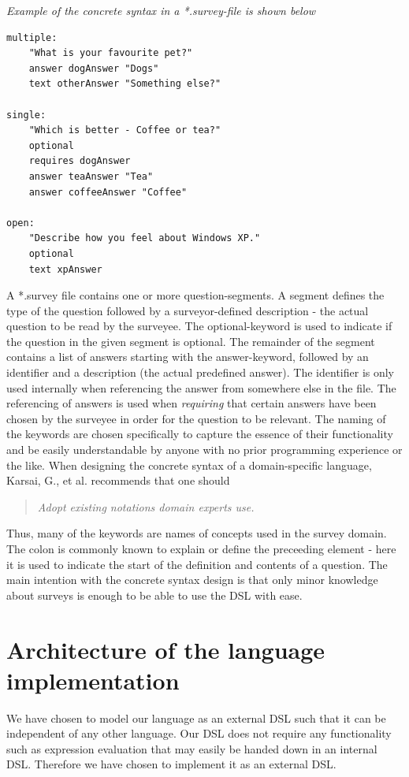 \documentclass[runningheads]{llncs}
\begin{document}
\noindent
{\it Example of the concrete syntax in a *.survey-file is shown below}
\begin{verbatim}
multiple:
	"What is your favourite pet?"
	answer dogAnswer "Dogs"
	text otherAnswer "Something else?"

single:
	"Which is better - Coffee or tea?"
	optional
	requires dogAnswer
	answer teaAnswer "Tea"
	answer coffeeAnswer "Coffee" 

open:
	"Describe how you feel about Windows XP."
	optional
	text xpAnswer
\end{verbatim}
%
\noindent
A *.survey file contains one or more question-segments. A segment defines the type of the question followed by a surveyor-defined description - the actual question to be read by the surveyee. The optional-keyword is used to indicate if the question in the given segment is optional. The remainder of the segment contains a list of answers starting with the answer-keyword, followed by an identifier and a description (the actual predefined answer). The identifier is only used internally when referencing the answer from somewhere else in the file. The referencing of answers is used when \emph{requiring} that certain answers have been chosen by the surveyee in order for the question to be relevant. The naming of the keywords are chosen specifically to capture the essence of their functionality and be easily understandable by anyone with no prior programming experience or the like. When designing the concrete syntax of a domain-specific language, Karsai, G., et al.\cite{karsai} recommends that one should
\begin{quotation}
 \emph{Adopt existing notations domain experts use.}
\end{quotation}
Thus, many of the keywords are names of concepts used in the survey domain. The colon is commonly known to explain or define the preceeding element - here it is used to indicate the start of the definition and contents of a question. The main intention with the concrete syntax design is that only minor knowledge about surveys is enough to be able to use the DSL with ease. 

\section{Architecture of the language implementation}

We have chosen to model our language as an external DSL such that it can be independent of any other language. Our DSL does not require any functionality such as expression evaluation that may easily be handed down in an internal DSL. Therefore we have chosen to implement it as an external DSL. 
\end{document}

